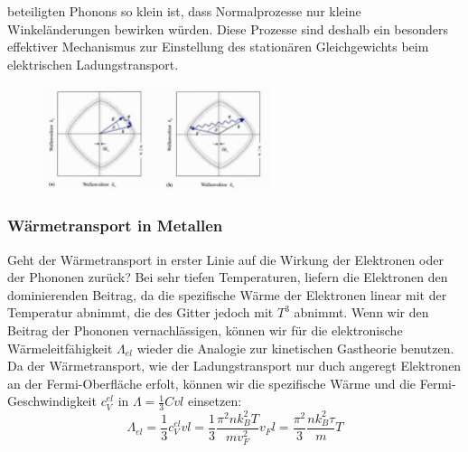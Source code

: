\documentclass[11pt]{article}
\begin{document}
beteiligten Phonons so klein ist, dass Normalprozesse nur kleine
Winkeländerungen bewirken würden. Diese Prozesse sind deshalb ein besonders
effektiver Mechanismus zur Einstellung des stationären Gleichgewichts beim
elektrischen Ladungstransport.
\begin{figure}[h]
\includegraphics[width=0.6\textwidth]{streuung}
\centering
\label{fig:streuung}
\end{figure}
\subsubsection{Wärmetransport in Metallen}
Geht der Wärmetransport in erster Linie auf die Wirkung der Elektronen oder der
Phononen zurück? Bei sehr tiefen Temperaturen, liefern die Elektronen den
dominierenden Beitrag, da die spezifische Wärme der Elektronen linear mit der
Temperatur abnimmt, die des Gitter jedoch mit $T^3$ abnimmt. Wenn wir den
Beitrag der Phononen vernachlässigen, können wir für die elektronische
Wärmeleitfähigkeit $\Lambda_{el}$ wieder die Analogie zur kinetischen Gastheorie
benutzen. Da der Wärmetransport, wie der Ladungstransport nur duch angeregt
Elektronen an der Fermi-Oberfläche erfolt, können wir die spezifische Wärme und
die Fermi-Geschwindigkeit $c_V^{el}$ in $\Lambda=\frac{1}{3}Cvl$ einsetzen:
\begin{equation}
  \Lambda_{el}=\frac{1}{3}c_V^{el}vl=\frac{1}{3}\frac{\pi^2nk_B^2T}{mv_F^2}v_Fl
  =\frac{\pi^2}{3}\frac{nk_B^2\tau}{m}T
\end{equation}
\end{document}
